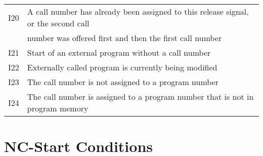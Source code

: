 \documentclass[openany,11pt]{book}
\begin{document}
\begin{table}[!h]
    \begin{tabular}{ll}
    I20 & A call number has already been assigned to this release signal, or the second call \\
        & number was offered first and then the first call number \\ 
    I21 & Start of an external program without a call number \\ 
    I22 & Externally called program is currently being modified \\ 
    I23 & The call number is not assigned to a program number \\ 
    I24 & The call number is assigned to a program number that is not in program memory \\ 
    \end{tabular}
\end{table}

\section*{NC-Start Conditions}
\end{document}
